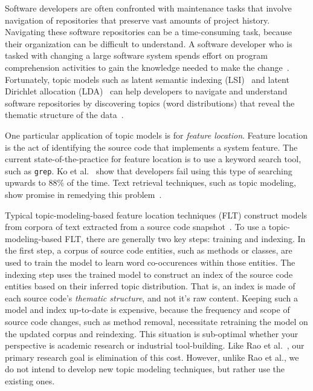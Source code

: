 
Software developers are often confronted with maintenance tasks that involve navigation of repositories that preserve vast amounts of project history.
Navigating these software repositories can be a time-consuming task, because their organization can be difficult to understand.
A software developer who is tasked with changing a large software system spends effort on program comprehension activities to gain the knowledge needed to make the change~\cite{Corbi:1989}.
Fortunately, topic models such as
latent semantic indexing (LSI)~\cite{Deerwester-etal:1990} and
latent Dirichlet allocation (LDA)~\cite{Blei-etal:2003}
can help developers to navigate and understand software repositories
by discovering topics (word distributions) that reveal the thematic structure
of the data~\cite{Linstead-etal:2007,Thomas-etal:2011,Hindle-etal:2012}.

One particular application of topic models is for \emph{feature location}.
Feature location is the act of identifying the source code that implements a system feature.
The current state-of-the-practice for feature location is to use a keyword search tool, such as \texttt{grep}.
Ko et al.~\cite{Ko-etal:2006} show that developers fail using this type of searching upwards to 88\% of the time.
Text retrieval techniques, such as topic modeling, show promise in remedying this problem~\cite{Marcus-etal:2004}.

Typical topic-modeling-based feature location techniques (FLT) construct models from corpora of text extracted from a source code snapshot~\cite{Dit-etal:2013b}.
To use a topic-modeling-based FLT, there are generally two key steps: training and indexing.
In the first step, a corpus of source code entities, such as methods or classes, are used to train the model to learn word co-occurences within those entities.
The indexing step uses the trained model to construct an index of the source code entities based on their inferred topic distribution. 
That is, an index is made of each source code's \emph{thematic structure}, and not it's raw content.
Keeping such a model and index up-to-date is expensive, because the frequency and scope of source code changes, such as method removal, necessitate retraining the model on the updated corpus and reindexing.
This situation is sub-optimal whether your perspective is academic research or industrial tool-building.
Like Rao et al.~\cite{Rao-etal:2013}, our primary research goal is elimination of this cost.
However, unlike Rao et al., we do not intend to develop new topic modeling techniques,
but rather use the existing ones.

